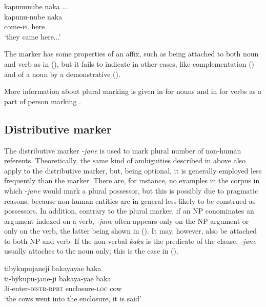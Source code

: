 \ea\label{ex:FirstPlural-6}
\begingl
\glpreamble kapununube naka ...\\
\gla kapunu-nube naka\\
\glb come-\textsc{pl} here\\
\glft ‘they came here...’
\endgl
\trailingcitation{[jmx-e090727s.322]}
\xe

The marker has some properties of an  affix, such as being attached to both noun and verb as in (), but it fails to indicate  in other cases, like complementation () and  of a noun by a demonstrative ().


More information about plural marking is given in  for nouns and in  for verbs as a part of person marking .



\subsection{Distributive marker}\label{sec:AffClDistributive}

The distributive marker \textit{-jane} is used to mark plural number of non-human referents. Theoretically, the same kind of ambiguities described in  above also apply to the distributive marker, but, being optional, it is generally employed less frequently than the  marker. There are, for instance, no examples in the corpus in which \textit{-jane} would mark a plural possessor, but this is possibly due to pragmatic reasons, because non-human entities are in general less likely to be construed as possessors. In addition, contrary to the plural marker, if an NP conominates an argument indexed on a verb, \textit{-jane} often appears only on the NP argument or only on the verb, the latter being shown in (). It may, however, also be attached to both NP and verb. If the non-verbal  \textit{kaku} is the predicate of the clause, \textit{-jane} usually attaches to the noun only; this is the case in ().

\ea\label{ex:new23-janeV}
\begingl 
\glpreamble tibÿkupujaneji bakayayae baka\\
\gla ti-bÿkupu-jane-ji bakaya-yae baka \\ 
\glb 3i-enter-\textsc{distr}-\textsc{rprt} enclosure-\textsc{loc} cow\\ 
\glft ‘the cows went into the enclosure, it is said’
\endgl
\trailingcitation{[jxx-p151016l-2]}
\xe

